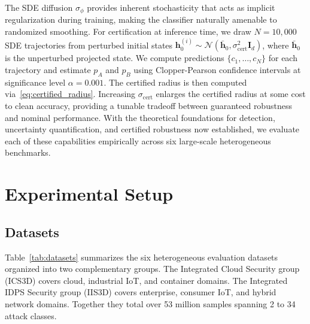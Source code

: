 \documentclass[journal]{IEEEtran}
\newcommand{\N}{\mathcal{N}}
\begin{document}
The SDE diffusion $\sigma_\phi$ provides inherent stochasticity that acts as implicit regularization during training, making the classifier naturally amenable to randomized smoothing. For certification at inference time, we draw $N = 10{,}000$ SDE trajectories from perturbed initial states $\mathbf{h}_0^{(i)} \sim \N(\bar{\mathbf{h}}_0, \sigma_{\mathrm{cert}}^2 \mathbf{I}_d)$, where $\bar{\mathbf{h}}_0$ is the unperturbed projected state. We compute predictions $\{c_1, \ldots, c_N\}$ for each trajectory and estimate $p_A$ and $p_B$ using Clopper-Pearson confidence intervals at significance level $\alpha = 0.001$. The certified radius is then computed via~\eqref{eq:certified_radius}. Increasing $\sigma_{\mathrm{cert}}$ enlarges the certified radius at some cost to clean accuracy, providing a tunable tradeoff between guaranteed robustness and nominal performance. With the theoretical foundations for detection, uncertainty quantification, and certified robustness now established, we evaluate each of these capabilities empirically across six large-scale heterogeneous benchmarks.


\section{Experimental Setup}
\label{sec:experiments}

\subsection{Datasets}

Table~\ref{tab:datasets} summarizes the six heterogeneous evaluation datasets organized into two complementary groups. The Integrated Cloud Security group (ICS3D) covers cloud, industrial IoT, and container domains. The Integrated IDPS Security group (IIS3D) covers enterprise, consumer IoT, and hybrid network domains. Together they total over 53 million samples spanning 2 to 34 attack classes.
\end{document}
